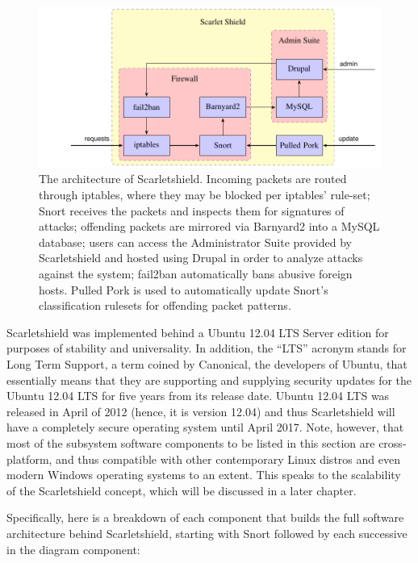 \documentclass[12pt,letterpaper,titlepage]{report}
\begin{document}
{\begin{figure}[h]
\centering
  \includegraphics{./scarlet-shield-diagram2.pdf}
  \caption{The architecture of Scarletshield. Incoming packets are routed
  through iptables, where they may be blocked per iptables' rule-set; Snort receives
  the packets and inspects them for signatures of attacks; offending packets are 
  mirrored via Barnyard2 into a MySQL database; users can access the Administrator
  Suite provided by Scarletshield and hosted using Drupal in order to analyze
  attacks against the system; fail2ban automatically bans abusive foreign hosts. 
  Pulled Pork is used to automatically update Snort's classification rulesets
  for offending packet patterns.}
\end{figure}

Scarletshield was implemented behind a Ubuntu 12.04 LTS Server edition for
purposes of stability and universality.  In addition, the “LTS” acronym stands
for Long Term Support, a term coined by Canonical, the developers of Ubuntu,
that essentially means that they are supporting and supplying security updates
for the Ubuntu 12.04 LTS for five years from its release date.  Ubuntu 12.04 LTS was
released in April of 2012 (hence, it is version 12.04) and thus Scarletshield will
have a completely secure operating system until April 2017.  Note, however, that
most of the subsystem software components to be listed in this section are
cross-platform, and thus compatible with other contemporary Linux distros and
even modern Windows operating systems to an extent.  This speaks to the
scalability of the Scarletshield concept, which will be discussed in a later
chapter.

Specifically, here is a breakdown of each component that builds the full
software architecture behind Scarletshield, starting with Snort followed by each
successive in the diagram component:

}
\end{document}
